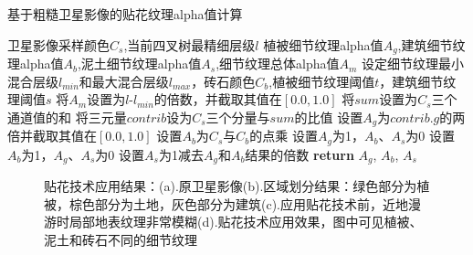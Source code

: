 \begin{algorithm}[h]
	\renewcommand{\algorithmicrequire}{\textbf{Input:}}
	\renewcommand{\algorithmicensure}{\textbf{Output:}}
	\caption{基于粗糙卫星影像的贴花纹理alpha值计算}
	\label{alg:1}
	\begin{algorithmic}[1]
		\REQUIRE 卫星影像采样颜色$C_s$,当前四叉树最精细层级$l$
		\ENSURE 植被细节纹理alpha值$A_g$,建筑细节纹理alpha值$A_b$,泥土细节纹理alpha值$A_s$,细节纹理总体alpha值$A_m$
		\STATE 设定细节纹理最小混合层级$l_{min}$和最大混合层级$l_{max}$，砖石颜色$C_b$,植被细节纹理阈值$t$，建筑细节纹理阈值$s$
		\STATE 将$A_m$设置为$l$-$l_{min}$的倍数，并截取其值在$[0.0,1.0]$
		\STATE 将$sum$设置为$C_s$三个通道值的和
		\STATE 将三元量$contrib$设为$C_s$三个分量与$sum$的比值
		\STATE 设置$A_g$为$contrib.g$的两倍并截取其值在$[0.0,1.0]$
		\STATE 设置$A_b$为$C_s$与$C_b$的点乘
	    \STATE 设置$A_g$为1，$A_b$、$A_s$为0
	    \STATE 设置$A_b$为1，$A_g$、$A_s$为0
	    \ELSE 
	    \STATE 设置$A_s$为1减去$A_g$和$A_b$结果的倍数
		\ENDIF
		\STATE \textbf{return} $A_g$, $A_b$, $A_s$
	\end{algorithmic}  
\end{algorithm}
\begin{figure}[H]
    \centering
    \caption{贴花技术应用结果：(a).原卫星影像(b).区域划分结果：绿色部分为植被，棕色部分为土地，灰色部分为建筑(c).应用贴花技术前，近地漫游时局部地表纹理非常模糊(d).贴花技术应用效果，图中可见植被、泥土和砖石不同的细节纹理}
\end{figure}
